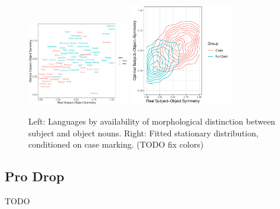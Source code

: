 \documentclass[11pt,a4paper]{article}
\newcommand\mhahn[1]{{\color{red}(#1)}}
\begin{document}
\begin{figure}
    \centering
    \includegraphics[width=0.4\textwidth]{../analysis/figures/by_patient_marking.pdf}
    \includegraphics[width=0.4\textwidth]{../change/visualize/stationary_case.pdf}
    \caption{Left: Languages by availability of morphological distinction between subject and object nouns. Right: Fitted stationary distribution, conditioned on case marking. \mhahn{TODO fix colors}}
    \label{fig:langs-case}
\end{figure}







\subsection{Pro Drop}
TODO
\end{document}
